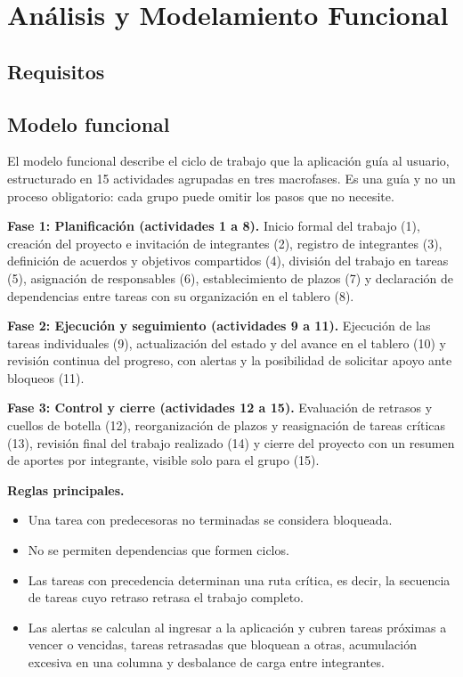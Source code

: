 \documentclass[conference]{IEEEtran}
\begin{document}
\section{Análisis y Modelamiento Funcional}
\subsection{Requisitos}
\subsection{Modelo funcional}
El modelo funcional describe el ciclo de trabajo que la aplicación guía al usuario, estructurado en 15 actividades agrupadas en tres macrofases. Es una guía y no un proceso obligatorio: cada grupo puede omitir los pasos que no necesite.

\textbf{Fase 1: Planificación (actividades 1 a 8).} Inicio formal del trabajo (1), creación del proyecto e invitación de integrantes (2), registro de integrantes (3), definición de acuerdos y objetivos compartidos (4), división del trabajo en tareas (5), asignación de responsables (6), establecimiento de plazos (7) y declaración de dependencias entre tareas con su organización en el tablero (8).

\textbf{Fase 2: Ejecución y seguimiento (actividades 9 a 11).} Ejecución de las tareas individuales (9), actualización del estado y del avance en el tablero (10) y revisión continua del progreso, con alertas y la posibilidad de solicitar apoyo ante bloqueos (11).

\textbf{Fase 3: Control y cierre (actividades 12 a 15).} Evaluación de retrasos y cuellos de botella (12), reorganización de plazos y reasignación de tareas críticas (13), revisión final del trabajo realizado (14) y cierre del proyecto con un resumen de aportes por integrante, visible solo para el grupo (15).

\textbf{Reglas principales.}
\begin{itemize}
    \item Una tarea con predecesoras no terminadas se considera bloqueada.
    \item No se permiten dependencias que formen ciclos.
    \item Las tareas con precedencia determinan una ruta crítica, es decir, la secuencia de tareas cuyo retraso retrasa el trabajo completo.
    \item Las alertas se calculan al ingresar a la aplicación y cubren tareas próximas a vencer o vencidas, tareas retrasadas que bloquean a otras, acumulación excesiva en una columna y desbalance de carga entre integrantes.
\end{itemize}
\end{document}
